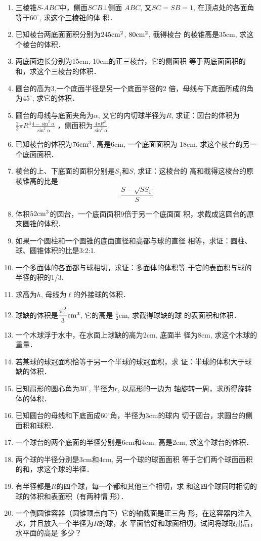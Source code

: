 \begin{enumerate}
\item 三棱锥$S$-$ABC$中，侧面$SCB\bot$侧面 $ABC$, 又$SC=SB
=1$, 在顶点处的各面角等于$60^{\circ}$, 求这个三棱锥的体
积．
\item 已知棱台两底面面积分别为$245{\rm cm^2}$, $80{\rm cm^2}$, 截得棱台
的棱锥高是35cm, 求这个棱台的体积．
\item 两底面边长分别为15cm, 10cm的正三棱台，它的侧面积
等于两底面面积的和，求这个三棱台的体积．
\item 圆台的高为3,一个底面半径是另一个底面半径的2
倍，母线与下底面所成的角为$45^{\circ}$, 求它的体积．
\item 圆台的母线与底面夹角为$\alpha$, 又它的内切球半径为$R$, 
求证：圆台的体积为$\frac{2}{3}\pi R^3\frac{4-\sin^2\alpha}{\sin^2\alpha}$
，侧面积为$\frac{4\pi R^2}{\sin^2\alpha}$.
\item 已知棱台的体积为$76{\rm cm^3}$, 高是6cm, 一个底面面积为
18cm, 求这个棱台的另一个底面面积．
\item 棱台的上、下底面的面积分别是$S_1$和$S$, 求证：这棱台的
高和截得这棱台的原棱锥高的比是
\[\frac{S-\sqrt{SS_1}}{S}\]
\item 体积$52{\rm cm^3}$的圆台，一个底面面积9倍于另一个底面面
积，求截成这圆台的原来圆锥的体积．
\item 如果一个圆柱和一个圆锥的底面直径和高都与球的直径
相等，求证：圆柱、球、圆锥体积的比是3:2:1.
\item 一个多面体的各面都与球相切，求证：多面体的体积等
于它的表面积与球的半径的积的1/3.
\item 求高为$h$, 母线为$\ell$的外接球的体积．
\item 球缺的体积是$\frac{\pi^2}{3}{\rm cm^3}$, 它的高是
$\frac{1}{2}$cm, 求截得球缺的球
的表面积和体积．
\item 一个木球浮于水中，在水面上球缺的高为2cm, 底面半
径为8cm, 求这个木球的重量．
\item 若某球的球冠面积恰等于另一个半球的球冠面积，求
证：半球的体积大于球缺的体积．
\item 已知扇形的圆心角为$30^{\circ}$, 半径为$r$, 以扇形的一边为
轴旋转一周，求所得旋转体的体积．
\item 已知圆台的母线和下底面成$60^{\circ}$角，半径为3cm的球内
切于圆台，求圆台的侧面积和球积．
\item 一个球台的两个底面的半径分别是6cm和4cm, 高是2cm, 
求这个球台的体积．
\item 两个球的半径分别是3cm和4cm, 另一个球的球面面积
等于它们两个球面面积的和，求这个球的半径．
\item 有半径都是$R$的四个球，每一个都和其他三个相切，求
和这四个球同时相切的球的体积和表面积（有两种情
形）．
\item 一个倒圆锥容器（圆锥顶点向下）它的轴截面是正三角
形，在这容器内注入水，并且放入一个半径为$R$的球，水
平面恰好和球面相切，试问将球取出后，水平面的高是
多少？
\end{enumerate}


